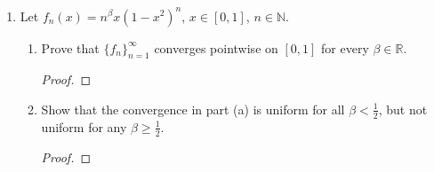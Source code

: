 \documentclass[reqno]{article}
\theoremstyle{remark}
\numberwithin{equation}{section}
\newcommand{\N}{\mathbb{N}}
\newcommand{\R}{\mathbb{R}}
\begin{document}
\begin{enumerate}
\begin{proof}
    Now, suppose $c=1$. If there exists $x\in (0,1)$ such that $x<f(x)$ then by the mean value theorem on the interval $(0,x)$ there exists $s\in (0,x)$ such that $f'(s)=\frac{f(x)}{x}>1$ since $f(x)>x$. Likewise, if there exists $x\in (0,1)$ such that $x>f(x)$ then the mean value theorem on $(x,1)$ gives a point $t\in (x,1)$ such that $\left\lvert f'(t)\right\rvert=\left\lvert \frac{f(1)-f(x)}{1-x}\right\rvert=\left\lvert\frac{1-f(x)}{1-x}\right\rvert>1$ since $x>f(x)$. So, on $(0,1)$, if the proposition does not hold then $f(x)=x$.
    Similarly, if there exists $x\in (1,2)$ such that $f(x)>2-x$ then the mean value theorem yields a point $u\in (x,2)$ such that $|f'(u)|=\left\lvert \frac{f(2)-f(x)}{2-x}\right\rvert=\left\lvert \frac{-f(x)}{2-x}\right\rvert>1$ since $f(x)>2-x$. If there exists $y\in (1,2)$ such that $f(y)<2-y$ then again by the mean value theorem there exists $v\in (1,y)$ such that $|f'(v)|=\left\lvert\frac{f(y)-f(1)}{y-1}\right\rvert=\left\lvert\frac{f(y)-1}{y-1}\right\rvert>1$ since $f(y)<2-y$ so $|f(y)-1|>|y-1|$. So, on $(1,2)$ if the proposition does not hold then $f(x)=2-x$. However, notice that since $f(x)$ is differentiable at $x=1$ we cannot have $f(x)=x$ on $(0,1)$ and $f(x)=2-x$ on $(1,2)$.
\end{proof} 

\item Let $f_n(x) = n^\beta x(1-x^2)^n$, $x \in [0,1]$, $n \in \N$. 

\begin{enumerate} 

\item Prove that $\{f_n\}_{n=1}^\infty$ converges pointwise on $[0,1]$ for every $\beta \in \R$. 

\begin{proof} 

\end{proof} 

\item Show that the convergence in part (a) is uniform for all $\beta < \frac{1}{2}$, but not uniform for any $\beta \geq \frac{1}{2}$. 

\begin{proof} 

\end{proof} 

\end{enumerate} 


\end{enumerate}
\end{document}
